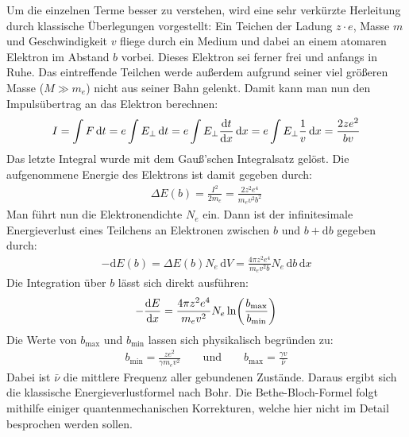Um die einzelnen Terme besser zu verstehen, wird eine sehr verkürzte Herleitung durch klassische Überlegungen vorgestellt: Ein Teichen der Ladung $z\cdot e$, Masse $m$ und Geschwindigkeit $v$ fliege durch ein Medium und dabei an einem atomaren Elektron im Abstand $b$ vorbei. Dieses Elektron sei ferner frei und anfangs in Ruhe. Das eintreffende Teilchen werde außerdem aufgrund seiner viel größeren Masse ($M\gg m_e$) nicht aus seiner Bahn gelenkt. Damit kann man nun den Impulsübertrag an das Elektron berechnen:
\begin{align*}
	I=\int F \,\text{d}t=e\int E_\perp \,\text{d}t=e\int E_\perp \derivative{t}{x} \,\text{d}x=e\int E_\perp \frac{1}{v} \,\text{d}x=\frac{2ze^2}{bv}
\end{align*}
Das letzte Integral wurde mit dem Gauß'schen Integralsatz gelöst. Die aufgenommene Energie des Elektrons ist damit gegeben durch:
\begin{align*}
	\Delta E(b)=\frac{I^2}{2m_e}=\frac{2z^2e^4}{m_e v^2b^2}
\end{align*}
Man führt nun die Elektronendichte $N_e$ ein. Dann ist der infinitesimale Energieverlust eines Teilchens an Elektronen zwischen $b$ und $b+\text{d}b$ gegeben durch:
\begin{align*}
	-\text{d}E(b)=\Delta E(b)N_e \,\text{d}V= \frac{4\pi z^2e^4}{m_e v^2b}N_e \,\text{d}b \,\text{d}x
\end{align*}
Die Integration über $b$ lässt sich direkt ausführen:
\begin{align*}
	-\derivative{E}{x}=\frac{4\pi z^2e^4}{m_e v^2}N_e\ln(\frac{b_\text{max}}{b_\text{min}})
\end{align*}
Die Werte von $b_\text{max}$ und $b_\text{min}$ lassen sich physikalisch begründen zu:
\begin{align*}
	b_\text{min}= \frac{ze^2}{\gamma m_e v^2}\qquad\text{und}\qquad b_\text{max}=\frac{\gamma v}{\bar{\nu}}
\end{align*}
Dabei ist $\bar{\nu}$ die mittlere Frequenz aller gebundenen Zustände. Daraus ergibt sich die klassische Energieverlustformel nach Bohr. Die Bethe-Bloch-Formel folgt mithilfe einiger quantenmechanischen Korrekturen, welche hier nicht im Detail besprochen werden sollen.

